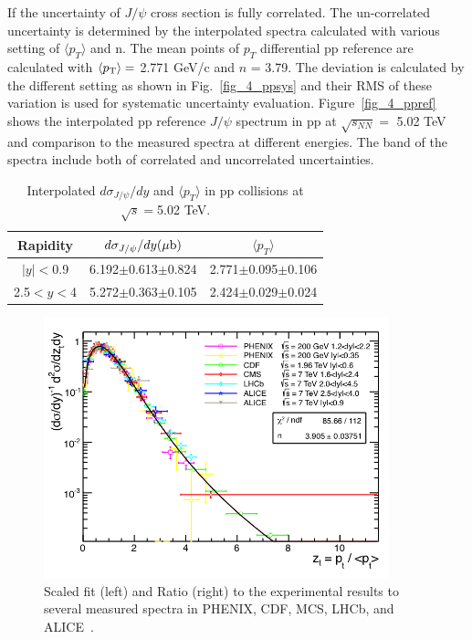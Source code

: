 If the uncertainty of $J/\psi$ cross section is fully correlated. 
The un-correlated uncertainty is determined by the interpolated spectra calculated with various setting of $\langle p_{T}\rangle$ and n. 
The mean points of $p_{T}$ differential pp reference are calculated with $\langle p_{\rm{T}}\rangle=$ 2.771 GeV/c and $n$ = 3.79. 
The deviation is calculated by the different setting as shown in Fig.~\ref{fig_4_ppsys} and their RMS of these variation is used for systematic uncertainty evaluation. 
Figure~\ref{fig_4_ppref} shows the interpolated pp reference $J/\psi$ spectrum in pp at $\sqrt{s_{NN}}=$ 5.02 TeV and comparison to the measured spectra at different energies. 
The band of the spectra include both of correlated and uncorrelated uncertainties. 
\begin{table}
  \centering
  \begin{tabular}{ccc} \hline
    Rapidity   & $d\sigma_{J/\psi}/dy (\mu \rm{b})$  & $\langle p_{T} \rangle$ \\ \hline
    $|y|<$0.9  & 6.192$\pm$0.613$\pm$0.824  & 2.771$\pm$0.095$\pm$0.106 \\
    2.5$<y<$4  & 5.272$\pm$0.363$\pm$0.105  & 2.424$\pm$0.029$\pm$0.024 \\ \hline
  \end{tabular}
  \caption{Interpolated $d\sigma_{J/\psi}/dy$ and $\langle p_{T}\rangle$ in pp collisions at $\sqrt{s}=$5.02 TeV.}
  \label{table_4_pprefvalue}
\end{table}


\begin{figure}[!h]
  \centering
  \includegraphics[width=10cm]{chap4/figure/ppref/univfit.png}
  \caption{Scaled fit (left) and Ratio (right) to the experimental results to several measured spectra in PHENIX, CDF, MCS, LHCb, and ALICE~\cite{bib_jpsippref}. 
  }
  \label{fig_4_ppfit}
\end{figure}

